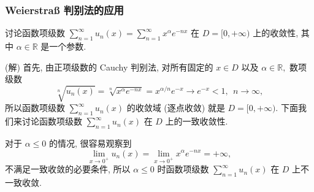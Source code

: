 
\begin{frame}
\frametitle{Weierstraß 判别法的应用}

\begin{eg}
讨论函数项级数 $\displaystyle \sum_{n=1}^\infty u_n(x) = \sum_{n=1}^\infty x^\alpha e^{-nx}$ 在 $D = [0, +\infty)$ 上的收敛性, 其中 $\alpha \in \mathbb{R}$ 是一个参数.
\end{eg}

\pause
\vspace{0.5em}

\startproof[bg=yellow, fg=red](解)
首先, 由正项级数的 Cauchy 判别法, 对所有固定的 $x \in D$ 以及 $\alpha \in \mathbb{R},$ 数项级数
\[
\sqrt[n]{u_n(x)} = \sqrt[n]{x^\alpha e^{-nx}} = x^{\alpha/n} e^{-x} \to e^{-x} < 1, ~~ n \to \infty,
\]
所以函数项级数 $\displaystyle \sum_{n=1}^\infty u_n(x)$ 的收敛域 (逐点收敛) 就是 $D = [0, +\infty).$ 下面我们来讨论函数项级数 $\displaystyle \sum_{n=1}^\infty u_n(x)$ 在 $D$ 上的一致收敛性.

\pause
\vspace{0.5em}

{\color{red}} 对于 $\alpha \leqslant 0$ 的情况, 很容易观察到
\[
\lim_{x \to 0^+} u_n(x) = \lim_{x \to 0^+} x^\alpha e^{-nx} = +\infty,
\]
不满足一致收敛的必要条件, 所以 $\alpha \leqslant 0$ 时函数项级数 $\displaystyle \sum_{n=1}^\infty u_n(x)$ 在 $D$ 上不一致收敛.

\end{frame}



